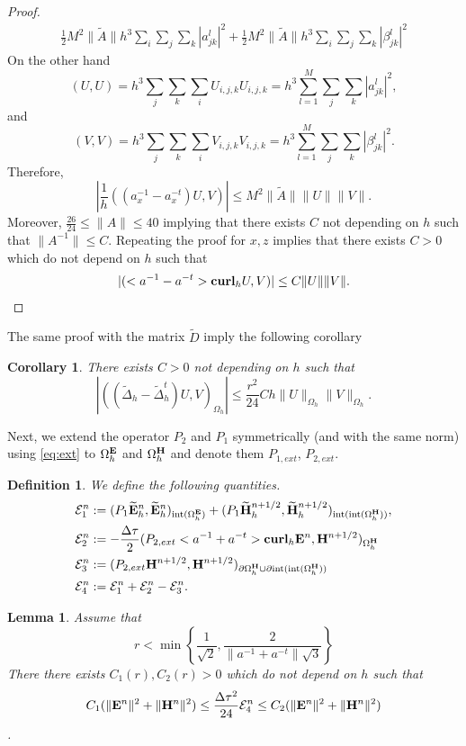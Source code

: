 \documentclass[12pt,reqno]{amsart}
\newcommand{\curl}{{\bf curl}}
\newcommand{\e}{{\bf E}}
\newcommand{\h}{{\bf H}}
\newtheorem{cor}[theorem]{Corollary}
\newtheorem{lem}[theorem]{Lemma}
\newtheorem{defi}[theorem]{Definition}
\theoremstyle{definition}
\numberwithin{equation}{section}
\newcommand{\intr}[1]{\mathrm{int}(#1)}
\def\Gwh{\Omega_h}
\begin{document}
\begin{proof}
\begin{align*}
  \frac{1}{2}M^2\|\tilde{A}\|h^3\sum_{i}\sum_j\sum_k |a_{jk}^l|^2
  +  \frac{1}{2}M^2\|\tilde{A}\|h^3\sum_{i}\sum_j\sum_k |\beta_{jk}^l|^2
  \end{align*}
On the other hand 
$$
(U,U)=h^3\sum_j\sum_k\sum_i U_{i,j,k}U_{i,j,k}=h^3\sum_{l=1}^M\sum_j\sum_k |a_{jk}^l|^2,
$$
and 
$$
(V,V)=h^3\sum_j\sum_k\sum_i V_{i,j,k}V_{i,j,k}=h^3\sum_{l=1}^M\sum_j\sum_k|\beta_{jk}^l|^2.
$$
Therefore,
$$
| \frac{1}{h}((a_x^{-1}-a_x^{-t})U,V)|\leq M^2\|\tilde{A}\|\|U\|\|V\|.
$$
Moreover, $\frac{26}{24}\leq \|A\|\leq 40$
implying that  there exists $C$ not depending on $h$ such that $\|A^{-1}\|\leq C$.
Repeating the proof for $x,z$
implies that
 there exists $C>0$ which do not depend on $h$ such that
\begin{align}
|	(<a^{-1}-a^{-t}>\curl_h U,V)|\leq C\|U\| \|V\|.
\end{align}
% 
\end{proof}
The same proof with the matrix $\tilde{D}$  imply the following corollary 
\begin{cor}\label{cor:Dtilde}
	There exists $C>0$ not depending on $h$ such that 
$$|	((\tilde{\Delta}_h-\tilde{\Delta}_h^t)U,V)_{\Gwh}|\leq \frac{r^2}{24}Ch \|U\|_{\Gwh}\|V\|_{\Gwh}.$$
\end{cor}
		Next, we extend the operator $P_2$ and $P_1$ symmetrically (and with the same norm) using \eqref{eq:ext}  to $\Gwh^{\e}$ and 
$\Gwh^{\h}$ and denote them $P_{1,ext}$, $P_{2,ext}$.
\begin{defi}

	We define the following quantities.
	\begin{align*}
		&
		\mathcal{E}_1^{n}:=
		(P_1\widetilde{\e}_h^{n},\widetilde{\e}_h^{n})_{\intr{\Gwh^\e}}+
		(P_1\widetilde{\h}_h^{n+1/2},\widetilde{\h}_h^{n+1/2})_{\intr{\intr{\Gwh^\h}}}, \\&
		\mathcal{E}_2^{n}:=-\frac{\Delta \tau}{2}(P_{2,ext}<a^{-1}+a^{-t}>\curl_h \e^{n},\h^{n+1/2})_{\Gwh^\h}\\&
		\mathcal{E}_3^{n}:=(P_{2,ext}\h^{n+1/2},\h^{n+1/2})_{\partial \Gwh^\h\cup \partial \intr{\intr{\Gwh^\h}}}\\&
		\mathcal{E}_4^{n}:=\mathcal{E}^n_1+\mathcal{E}^n_2-\mathcal{E}^n_3.
	\end{align*}
\end{defi}
\begin{lem}\label{lem:first}
	Assume that 
	\begin{equation}\label{eq:cfl}
	r<\min \left \{  \frac{1}{\sqrt{2}},\frac{2}{\|a^{-1}+a^{-t}\|\sqrt{3}}  \right \}
	\end{equation}
	There there exists $C_1(r),C_2(r)>0$ which do not depend on $h$ such that  
$$ C_1(\|\e^n\|^2+\|\h^n\|^2)\leq \frac{\Delta \tau^2}{24}\mathcal{E}_4^n\leq C_2(\|\e^n\|^2+\|\h^n\|^2) $$.
\end{lem}
\end{document}
